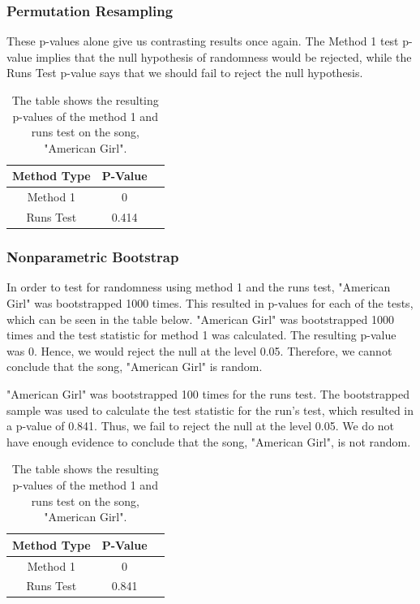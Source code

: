 \documentclass[12pt, letterpaper]{article}
\begin{document}
\subsubsection{Permutation Resampling}
These p-values alone give us contrasting results once again. The Method 1 test p-value implies that the null hypothesis of randomness would be rejected, while the Runs Test p-value says that we should fail to reject the null hypothesis. 
\begin{table}[h]
\begin{center}
\begin{tabular}{|c|c|c|}
\hline
\textbf{Method Type} & P-Value \\
\hline
Method 1 & 0  \\
\hline
Runs Test & 0.414 \\ 
\hline
\end{tabular}
\end{center}
\caption{The table shows the resulting p-values of the method 1 and runs test on the song, "American Girl".}
\label{fig: P-values for "American Girl": Permutation Resampling}
\end{table}

\subsubsection{Nonparametric Bootstrap}
In order to test for randomness using method 1 and the runs test, "American Girl" was bootstrapped 1000 times. This resulted in p-values for each of the tests, which can be seen in the table below. "American Girl" was bootstrapped 1000 times and the test statistic for method 1 was calculated. The resulting p-value was 0. Hence, we would reject the null at the level 0.05. Therefore, we cannot conclude that the song, "American Girl" is random. 

"American Girl" was bootstrapped 100 times for the runs test. The bootstrapped sample was used to calculate the test statistic for the run's test, which resulted in a p-value of 0.841. Thus, we fail to reject the null at the level 0.05. We do not have enough evidence to conclude that the song, "American Girl", is not random.
\begin{table}[h]
\begin{center}
\begin{tabular}{|c|c|c|}
\hline
\textbf{Method Type} & P-Value \\
\hline
Method 1 & 0  \\
\hline
Runs Test & 0.841 \\ 
\hline
\end{tabular}
\end{center}
\caption{The table shows the resulting p-values of the method 1 and runs test on the song, "American Girl".}
\label{fig: P-values for "American Girl": Nonparametric Bootstrap}
\end{table}
\end{document}
